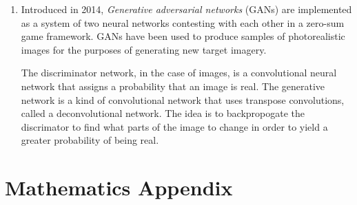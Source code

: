 \documentclass[10pt]{article}
\begin{document}
\begin{multicols}{2}
\begin{addmargin}[0.8em]{0.5em}
\begin{enumerate}[label=(\alph*)]
        \item Introduced in 2014, \textit{Generative adversarial networks} (GANs) are implemented as a system of two neural networks contesting with each other in a zero-sum game framework. GANs have been used to produce samples of photorealistic images for the purposes of generating new target imagery.
        
        The discriminator network, in the case of images, is a convolutional neural network that assigns a probability that an image is real. The generative network is a kind of convolutional network that uses transpose convolutions, called a deconvolutional network. The idea is to backpropogate the discrimator to find what parts of the image to change in order to yield a greater probability of being real.
    \end{enumerate}     
\end{addmargin}

\pagebreak

\section{Mathematics Appendix}
\begin{addmargin}[0.8em]{0.5em}
\vspace{-0.2cm}

\end{addmargin}
\end{multicols}
\end{document}
